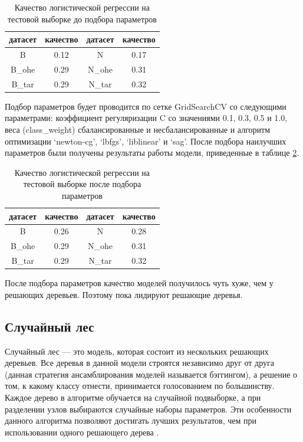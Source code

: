 \documentclass[14pt]{mmcs_article}
\begin{document}
\begin{table}[H]
	\centering
	\caption{Качество логистической регрессии на тестовой выборке до подбора параметров}\label{models:table3}
	\begin{tabular}{cccc}
		\hline
		датасет & качество	& датасет & качество \\
		\hline
		B &	0.12 &	N &	0.17 \\
		B\_ohe & 0.29 &	N\_ohe & 0.31\\
		B\_tar & 0.29 & N\_tar & 0.32 \\
		\hline
	\end{tabular}
\end{table}

Подбор параметров будет проводится по сетке GridSearchCV со следующими параметрами: коэффициент регуляризации C со значениями 0.1, 0.3, 0.5 и 1.0, веса (class\_weight) сбалансированные и несбалансированные и алгоритм оптимизации `newton-cg', `lbfgs', `liblinear' и `sag'. После подбора наилучших параметров были получены результаты работы модели, приведенные в таблице \ref{models:table4}.

\begin{table}[H]
	\centering
\caption{Качество логистической регрессии на тестовой выборке после подбора параметров}\label{models:table4}
\begin{tabular}{cccc}
	\hline
	датасет & качество	& датасет & качество \\
	\hline
	B &	0.26 &	N &	0.28 \\
	B\_ohe & 0.29 &	N\_ohe & 0.31\\
	B\_tar & 0.29 & N\_tar & 0.32 \\
	\hline
\end{tabular}
\end{table}

После подбора параметров качество моделей получилось чуть хуже, чем у решающих деревьев. Поэтому пока лидируют решающие деревья.


\subsection{Случайный лес}

Случайный лес --- это модель, которая состоит из нескольких решающих деревьев. Все деревья в данной модели строятся независимо друг от друга (данная стратегия ансамблирования моделей называется бэггингом), а решение о том, к какому классу отнести, принимается голосованием по большинству. Каждое дерево в алгоритме обучается на случайной подвыборке, а при разделении узлов выбираются случайные наборы параметров. Эти особенности данного алгоритма позволяют достигать лучших результатов, чем при использовании одного решающего дерева \cite{lib:randomforest}.
\end{document}
